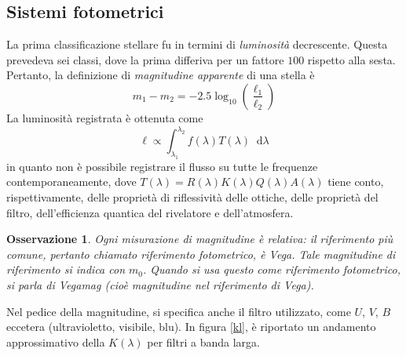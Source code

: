 \documentclass[11pt, a4paper]{scrartcl}
\theoremstyle{style}
\newtheorem{osservazione}{Osservazione}[section]
\theoremstyle{style1}
\newcommand{\dd}{\mathop{}\!\mathrm{d}}
\numberwithin{equation}{subsection}
\begin{document}
\subsection{Sistemi fotometrici}
La prima classificazione stellare fu in termini di \textit{luminosit\`a} decrescente.
Questa prevedeva sei classi, dove la prima differiva per un fattore $100$ rispetto alla sesta.
Pertanto, la definizione di \textit{magnitudine apparente} di una stella \`e 
\begin{equation}
	m_1-m_2 = - 2.5 \log_{10}\left(\frac{\ell _1}{\ell _2}\right)  
\end{equation}
La luminosit\`a registrata \`e ottenuta come
\[
\ell \propto \int _{\lambda _1} ^{\lambda _2} f(\lambda ) T(\lambda ) \dd \lambda 
\] 
in quanto non \`e possibile registrare il flusso su tutte le frequenze contemporaneamente, dove $T(\lambda ) = R(\lambda ) K(\lambda )Q(\lambda ) A(\lambda )$ tiene conto, rispettivamente, delle propriet\`a di riflessivit\`a delle ottiche, delle propriet\`a del filtro, dell'efficienza quantica del rivelatore e dell'atmosfera.
\begin{osservazione}
Ogni misurazione di magnitudine \`e relativa: il riferimento pi\`u comune, pertanto chiamato \textit{riferimento fotometrico}, \`e Vega. 
Tale magnitudine di riferimento si indica con $m_0$.
Quando si usa questo come riferimento fotometrico, si parla di \textit{Vegamag} (cio\`e magnitudine nel riferimento di Vega).
\end{osservazione}
\noindent Nel pedice della magnitudine, si specifica anche il filtro utilizzato, come $U$, $V$, $B$ eccetera (ultravioletto, visibile, blu). 
In figura \ref{kl}, \`e riportato un andamento approssimativo della $K(\lambda )$ per filtri a banda larga.
\end{document}
